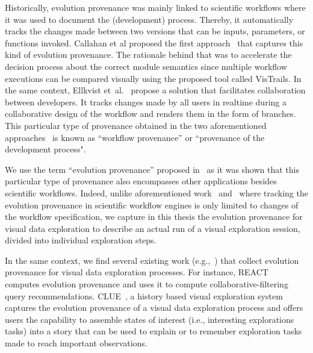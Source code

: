 \label{sec:evo-DM-related}
Historically, evolution provenance was mainly linked to scientific workflows where it was used to document the (development) process. 
Thereby, it automatically tracks the changes made between two versions that can be inputs, parameters, or functions invoked. 
Callahan et al proposed the first approach~\cite{Callahan06} that captures this kind of evolution provenance.
The rationale behind that was to accelerate the decision process about the correct module semantics since multiple workflow executions can be compared visually using the proposed tool called VisTrails.
In the same context, Ellkvist et~al.~\cite{Ellkvist:spri08} propose a solution that facilitates collaboration between developers. 
It tracks changes made by all users in realtime during a collaborative design of the workflow and renders them in the form of branches. 
This particular type of provenance obtained in the two aforementioned approaches~\cite{Callahan06,Ellkvist:spri08} is known as ``workflow provenance'' or ``provenance of the development process". 

We use the term ``evolution provenance'' proposed  in~\cite{Herschel2017survey} as it was shown that this particular type of provenance also encompasses other applications besides scientific workflows.
Indeed, unlike aforementioned work~\cite{Callahan06} and~\cite{Ellkvist:spri08} where tracking the evolution provenance in scientific workflow engines is only limited to changes of the workflow specification, we capture in this thesis the evolution provenance for visual data exploration to describe an actual run of a visual exploration session, divided into individual exploration steps. 




In the same context, we find several existing work (e.g.,~\cite{Milo:2016,2016_eurovis_clue}) that collect evolution provenance for visual data exploration processes.
For instance, REACT~\cite{Milo:2016} computes evolution provenance and uses it to compute collaborative-filtering query recommendations.
CLUE~\cite{2016_eurovis_clue}, a history based visual exploration system captures the evolution provenance of a visual data exploration process and offers users the capability to assemble states of interest (i.e., interesting explorations tasks) into a story that can be used to explain or to remember exploration tasks made to reach important observations.



